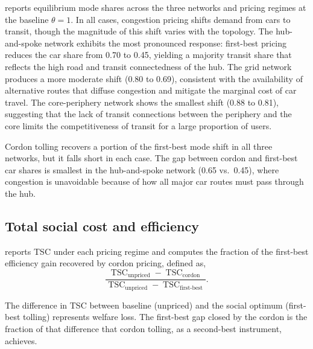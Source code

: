 \documentclass[12pt]{article}
\DeclareMathOperator{\TSC}{TSC}
\begin{document}
 reports equilibrium mode shares across the three networks and pricing regimes at the baseline $\theta = 1$.
In all cases, congestion pricing shifts demand from cars to transit, though the magnitude of this shift varies with the topology.
The hub-and-spoke network exhibits the most pronounced response: first-best pricing reduces the car share from 0.70 to 0.45, yielding a majority transit share that reflects the high road and transit connectedness of the hub.
The grid network produces a more moderate shift (0.80 to 0.69), consistent with the availability of alternative routes that diffuse congestion and mitigate the marginal cost of car travel.
The core-periphery network shows the smallest shift (0.88 to 0.81), suggesting that the lack of transit connections between the periphery and the core limits the competitiveness of transit for a large proportion of users.

Cordon tolling recovers a portion of the first-best mode shift in all three networks, but it falls short in each case.
The gap between cordon and first-best car shares is smallest in the hub-and-spoke network (0.65 vs.\ 0.45), where congestion is unavoidable because of how all major car routes must pass through the hub.

\begin{table}[htbp]
    \centering
    \footnotesize
    
    \caption{Equilibrium mode shares in each network under each pricing regime.}
    \label{tab:mode_shares_baseline}
\end{table}

\subsection{Total social cost and efficiency}

 reports TSC under each pricing regime and computes the fraction of the first-best efficiency gain recovered by cordon pricing, defined as,
\[
    \frac{\TSC_\text{unpriced} - \TSC_\text{cordon}}{\TSC_\text{unpriced} - \TSC_\text{first-best}}.
\]
\begin{table}[htbp]
    \centering
    \footnotesize
    
    \caption{TSC in each network under each pricing regime.}
    \label{tab:tsc_baseline}
\end{table}
The difference in TSC between baseline (unpriced) and the social optimum (first-best tolling) represents welfare loss. The first-best gap closed by the cordon is the fraction of that difference that cordon tolling, as a second-best instrument, achieves.
\end{document}
